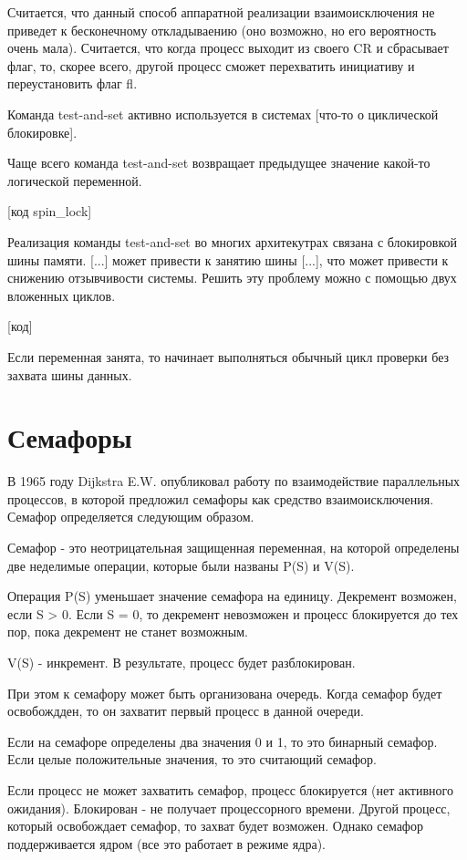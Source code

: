 \documentclass[a4paper, 14pt]{report}
\begin{document}
	Считается, что данный способ аппаратной реализации взаимоисключения не приведет к бесконечному откладываению (оно возможно, но его вероятность очень мала). Считается, что когда процесс выходит из своего CR и сбрасывает флаг, то, скорее всего, другой процесс сможет перехватить инициативу и переустановить флаг fl.
	
	Команда test-and-set активно используется в системах [что-то о циклической блокировке].
	
	Чаще всего команда test-and-set возвращает предыдущее значение какой-то логической переменной.
	
	[код spin\_lock]
	
	Реализация команды test-and-set во многих архитекутрах связана с блокировкой шины памяти. [...] может привести к занятию шины [...], что может привести к снижению отзывчивости системы. Решить эту проблему можно с помощью двух вложенных циклов.
	
	[код]
	
	Если переменная занята, то начинает выполняться обычный цикл проверки без захвата шины данных.
	
	\section*{Семафоры}
	
	В 1965 году Dijkstra E.W. опубликовал работу по взаимодействие параллельных процессов, в которой предложил семафоры как средство взаимоисключения. Семафор определяется следующим образом.
	
	Семафор - это неотрицательная защищенная переменная, на которой определены две неделимые операции, которые были названы P(S) и V(S).
	
	Операция P(S) уменьшает значение семафора на единицу. Декремент возможен, если S > 0. Если S = 0, то декремент невозможен и процесс блокируется до тех пор, пока декремент не станет возможным.
	
	V(S) - инкремент. В результате, процесс будет разблокирован.
	
	При этом к семафору может быть организована очередь. Когда семафор будет освобождден, то он захватит первый процесс в данной очереди.
	
	Если на семафоре определены два значения 0 и 1, то это бинарный семафор. Если целые положительные значения, то это считающий семафор.
	
	Если процесс не может захватить семафор, процесс блокируется (нет активного ожидания). Блокирован - не получает процессорного времени. Другой процесс, который освобождает семафор, то захват будет возможен. Однако семафор поддерживается ядром (все это работает в режиме ядра).
	
\end{document}
